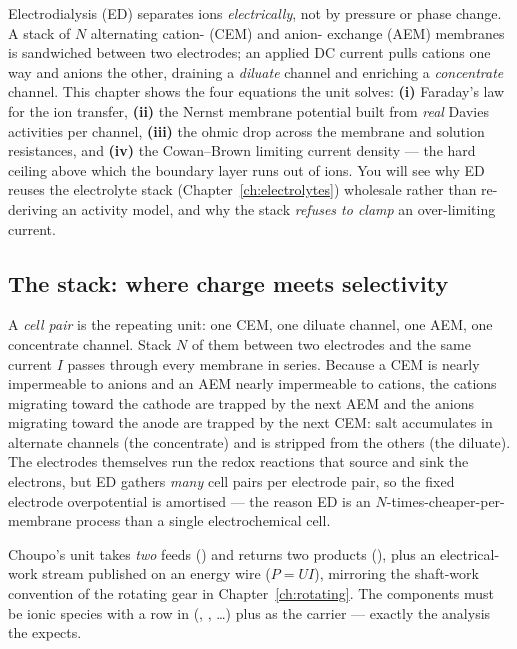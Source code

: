 \documentclass[11pt,a4paper]{article}
\begin{document}
\begin{whatyoulllearn}
Electrodialysis (ED) separates ions \emph{electrically}, not by pressure
or phase change.  A stack of $N$ alternating cation- (CEM) and anion-
exchange (AEM) membranes is sandwiched between two electrodes; an applied
DC current pulls cations one way and anions the other, draining a
\emph{diluate} channel and enriching a \emph{concentrate} channel.  This
chapter shows the four equations the  unit
solves: \textbf{(i)} Faraday's law for the ion transfer, \textbf{(ii)}
the Nernst membrane potential built from \emph{real} Davies activities
per channel, \textbf{(iii)} the ohmic drop across the membrane and
solution resistances, and \textbf{(iv)} the Cowan--Brown limiting
current density --- the hard ceiling above which the boundary layer runs
out of ions.  You will see why ED reuses the electrolyte stack
(Chapter~\ref{ch:electrolytes}) wholesale rather than re-deriving an
activity model, and why the stack \emph{refuses to clamp} an
over-limiting current.
\end{whatyoulllearn}

\subsection{The stack: where charge meets selectivity}

A \emph{cell pair} is the repeating unit: one CEM, one diluate channel,
one AEM, one concentrate channel.  Stack $N$ of them between two
electrodes and the same current $I$ passes through every membrane in
series.  Because a CEM is nearly impermeable to anions and an AEM nearly
impermeable to cations, the cations migrating toward the cathode are
trapped by the next AEM and the anions migrating toward the anode are
trapped by the next CEM: salt accumulates in alternate channels (the
concentrate) and is stripped from the others (the diluate).  The
electrodes themselves run the redox reactions that source and sink the
electrons, but ED gathers \emph{many} cell pairs per electrode pair, so
the fixed electrode overpotential is amortised --- the reason ED is an
$N$-times-cheaper-per-membrane process than a single electrochemical
cell.

Choupo's unit takes \emph{two} feeds () and returns two products
(), plus an electrical-work stream
published on an energy wire ($P=UI$), mirroring the shaft-work convention
of the rotating gear in Chapter~\ref{ch:rotating}.  The components must
be ionic species with a row in \file{ions.dat} (\code{Na}, \code{Cl},
\dots) plus \code{water} as the carrier --- exactly the analysis the
\code{ionExchanger} expects.
\end{document}

